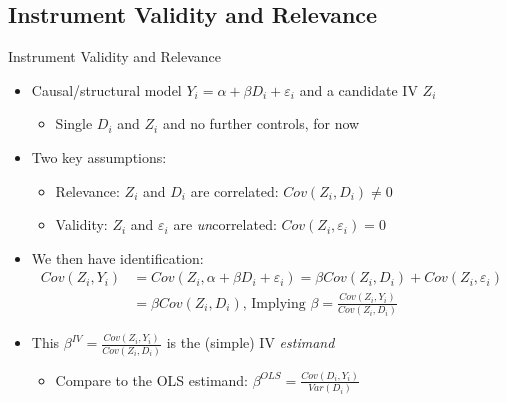 \documentclass{beamer}
\begin{document}
\subsection{Instrument Validity and Relevance}
\begin{frame}{Instrument Validity and Relevance}
\begin{itemize}
\item Causal/structural model $Y_i=\alpha+\beta D_i+\varepsilon_i$ and a candidate IV $Z_i$ \smallskip
\begin{itemize}
\item Single $D_i$ and $Z_i$ and no further controls, for now
\end{itemize}\medskip\pause{}
\item Two key assumptions:\smallskip
\begin{itemize}
\item Relevance: $Z_i$ and $D_i$ are correlated: $Cov(Z_i,D_i)\neq 0$ \smallskip
\item Validity: $Z_i$ and $\varepsilon_i$ are \emph{un}correlated: $Cov(Z_i,\varepsilon_i)=0$
\end{itemize}\medskip\pause{}
\item We then have identification:\vspace{-0.3cm}
\begin{align*}
Cov(Z_i,Y_i)&=Cov(Z_i,\alpha+\beta D_i+\varepsilon_i)=\beta Cov(Z_i,D_i)+Cov(Z_i,\varepsilon_i)\\
&=\beta Cov(Z_i,D_i)\text{, Implying $\beta=\frac{Cov(Z_i,Y_i)}{Cov(Z_i,D_i)}$}
\end{align*}\pause{}\vspace{-0.3cm}
\item This $\beta^{IV}=\frac{Cov(Z_i,Y_i)}{Cov(Z_i,D_i)}$ is the (simple) IV \emph{estimand}\smallskip\pause{}
\begin{itemize}
\item Compare to the OLS estimand: $\beta^{OLS}=\frac{Cov(D_i,Y_i)}{Var(D_i)}$ 
\end{itemize}
\end{itemize}
\end{frame}
\end{document}
